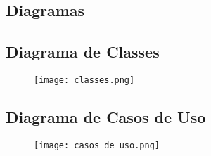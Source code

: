 \begin{landscape}
\section{Diagramas}\label{diagramas}

\subsection{Diagrama de Classes}
\begin{figure}[htb]
	\centering
	\texttt{[image: classes.png]}
\end{figure}

%

\subsection{Diagrama de Casos de Uso}
\begin{figure}[htb]
	\centering
	\texttt{[image: casos\_de\_uso.png]}
\end{figure}
\end{landscape}